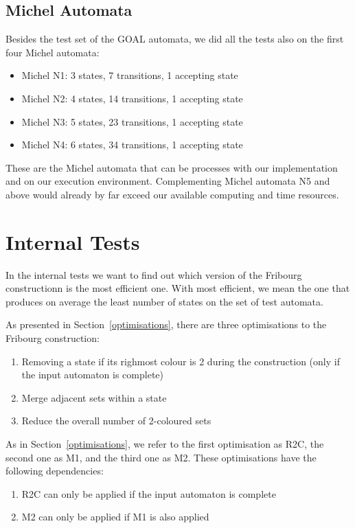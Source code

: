 \subsection{Michel Automata}
Besides the test set of the GOAL automata, we did all the tests also on the first four Michel automata:
\begin{itemize}
\item Michel N1: 3 states, 7 transitions, 1 accepting state
\item Michel N2: 4 states, 14 transitions, 1 accepting state
\item Michel N3: 5 states, 23 transitions, 1 accepting state
\item Michel N4: 6 states, 34 transitions, 1 accepting state
\end{itemize}

These are the Michel automata that can be processes with our implementation and on our execution environment. Complementing Michel automata N5 and above would already by far exceed our available computing and time resources.


\section{Internal Tests}
In the internal tests we want to find out which version of the Fribourg constructionn is the most efficient one. With most efficient, we mean the one that produces on average the least number of states on the set of test automata.

As presented in Section~\ref{optimisations}, there are three optimisations to the Fribourg construction:
\begin{enumerate}
\item Removing a state if its righmost colour is 2 during the construction (only if the input automaton is complete)
\item Merge adjacent sets within a state
\item Reduce the overall number of 2-coloured sets
\end{enumerate}

As in Section~\ref{optimisations}, we refer to the first optimisation as R2C, the second one as M1, and the third one as M2. These optimisations have the following dependencies:
\begin{enumerate}
\item R2C can only be applied if the input automaton is complete
\item M2 can only be applied if M1 is also applied
\end{enumerate}

